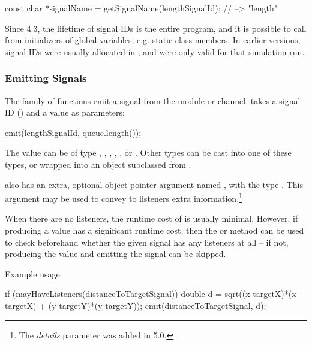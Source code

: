 \begin{cpp}
const char *signalName = getSignalName(lengthSignalId); // --> "length"
\end{cpp}

\begin{note}
  Since {\opp} 4.3, the lifetime of signal IDs is the entire program, and
  it is possible to call  from initializers of
  global variables, e.g. static class members. In earlier versions,
  signal IDs were usually allocated in , and were
  only valid for that simulation run.
\end{note}

\subsubsection{Emitting Signals}
\label{sec:simple-modules:emitting-signals}

The  family of functions emit a signal from the module or
channel.  takes a signal ID () and
a value as parameters:

\begin{cpp}
emit(lengthSignalId, queue.length());
\end{cpp}

The value can be of type , , , ,
, or . Other types can be cast into
one of these types, or wrapped into an object subclassed from .

 also has an extra, optional object pointer argument named
, with the type . This argument may be used
to convey to listeners extra information.\footnote{The \textit{details}
parameter was added in {\opp} 5.0.}

When there are no listeners, the runtime cost of  is usually minimal.
However, if producing a value has a significant runtime cost, then the
 or  method can be used
to check beforehand whether the given signal has any listeners at all --
if not, producing the value and emitting the signal can be skipped.

Example usage:

\begin{cpp}
if (mayHaveListeners(distanceToTargetSignal)) {
    double d = sqrt((x-targetX)*(x-targetX) + (y-targetY)*(y-targetY));
    emit(distanceToTargetSignal, d);
}
\end{cpp}

